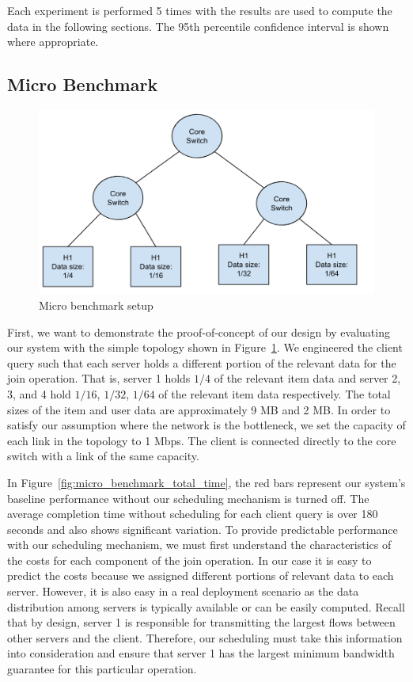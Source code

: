 \documentclass{sig-alternate-2013}
\begin{document}
Each experiment is performed 5 times with the results are used to compute the data in the following sections.
The 95th percentile confidence interval is shown where appropriate.

\subsection{Micro Benchmark}
\begin{figure}
    \centering
    \includegraphics[scale=2.5]{figures/Join_micro_benchmark.png}
    \caption{Micro benchmark setup}\label{fig:micro_benchmark}
\end{figure}

First, we want to demonstrate the proof-of-concept of our design by evaluating our system with the simple topology shown in Figure~\ref{fig:micro_benchmark}.
We engineered the client query such that each server holds a different portion of the relevant data for the join operation.
That is, server 1 holds $1/4$ of the relevant item data and server 2, 3, and 4 hold $1/16$, $1/32$, $1/64$ of the relevant item data respectively.
The total sizes of the item and user data are approximately 9 MB and 2 MB\@.
In order to satisfy our assumption where the network is the bottleneck, we set the capacity of each link in the topology to 1 Mbps.
The client is connected directly to the core switch with a link of the same capacity.

In Figure~\ref{fig:micro_benchmark_total_time}, the red bars represent our system's baseline performance without our scheduling mechanism is turned off.
The average completion time without scheduling for each client query is over 180 seconds and also shows significant variation.
To provide predictable performance with our scheduling mechanism, we must first understand the characteristics of the costs for each component of the join operation.
In our case it is easy to predict the costs because we assigned different portions of relevant data to each server.
However, it is also easy in a real deployment scenario as the data distribution among servers is typically available or can be easily computed.
Recall that by design, server 1 is responsible for transmitting the largest flows between other servers and the client. 
Therefore, our scheduling must take this information into consideration and ensure that server 1 has the largest minimum bandwidth guarantee for this particular operation.
\end{document}
